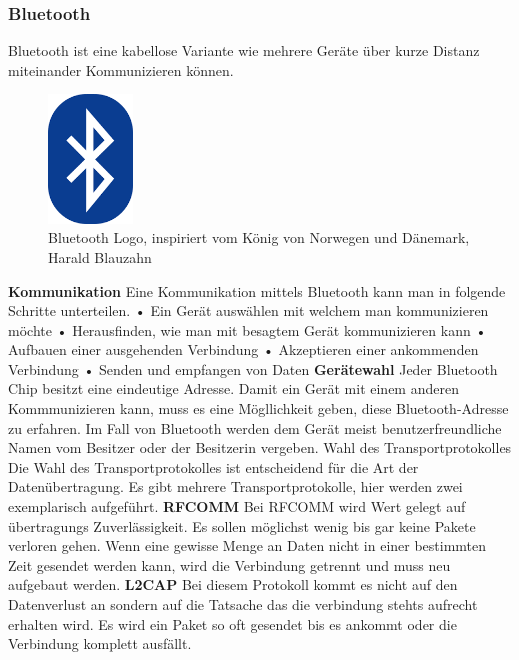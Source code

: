 \subsubsection{Bluetooth}
\label{subsec:Bluetooth}
Bluetooth ist eine kabellose Variante wie mehrere Geräte über kurze Distanz miteinander Kommunizieren können.

\begin{figure}
  \begin{center}
    \includegraphics[width=0.2\textwidth]{images/bluetooth}
  \end{center}
  \caption{Bluetooth Logo, inspiriert vom König von Norwegen und Dänemark, Harald Blauzahn \cite{PERT.CH2-bluetooth.logo}}\label{Fig:imgBluetoothLogo}
\end{figure}

\textbf{Kommunikation\newline}
Eine Kommunikation mittels Bluetooth kann man in folgende Schritte unterteilen.
\nextline
•	Ein Gerät auswählen mit welchem man kommunizieren möchte
\nextline
•	Herausfinden, wie man mit besagtem Gerät kommunizieren kann
\nextline
•	Aufbauen einer ausgehenden Verbindung
\nextline
•	Akzeptieren einer ankommenden Verbindung
\nextline
•	Senden und empfangen von Daten
\nextline
\textbf{Gerätewahl\nextline}
Jeder Bluetooth Chip besitzt eine eindeutige Adresse. Damit ein Gerät mit einem anderen Kommmunizieren kann, muss es eine Mögllichkeit geben, diese Bluetooth-Adresse zu erfahren. Im Fall von Bluetooth werden dem Gerät meist benutzerfreundliche Namen vom Besitzer oder der Besitzerin vergeben.
Wahl des Transportprotokolles
Die Wahl des Transportprotokolles ist entscheidend für die Art der Datenübertragung. Es gibt mehrere Transportprotokolle, hier werden zwei exemplarisch aufgeführt.
\nextline
\textbf{RFCOMM\nextline}
Bei RFCOMM wird Wert gelegt auf übertragungs Zuverlässigkeit. Es sollen möglichst wenig bis gar keine Pakete verloren gehen. Wenn eine gewisse Menge an Daten nicht in einer bestimmten Zeit gesendet werden kann, wird die Verbindung getrennt und muss neu aufgebaut werden.
\nextline
\textbf{L2CAP\nextline}
Bei diesem Protokoll kommt es nicht auf den Datenverlust an sondern auf die Tatsache das die verbindung stehts aufrecht erhalten wird. Es wird ein Paket so oft gesendet bis es ankommt oder die Verbindung komplett ausfällt.


\clearpage %